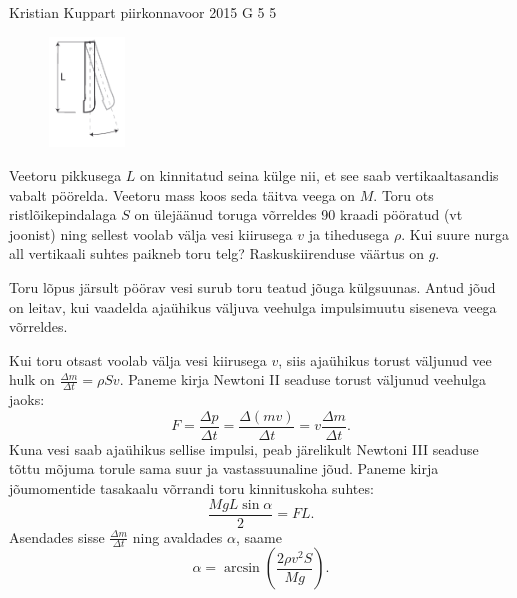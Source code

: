 {Kristian Kuppart} %
{piirkonnavoor} %
{2015} %
{G 5} %
{5} %
{
\ifStatement
\begin{figure}
 \vspace{-30pt}
 \begin{center}
 \includegraphics[width=0.18\textwidth]{2015-v2g-05-toru}
 \end{center}
\end{figure}
Veetoru pikkusega $L$ on kinnitatud seina külge nii, et see saab vertikaaltasandis vabalt pöörelda. Veetoru mass koos seda täitva veega on $M$. Toru ots ristlõikepindalaga $S$ on ülejäänud toruga võrreldes \num{90} kraadi pööratud (vt joonist) ning sellest voolab välja vesi kiirusega $v$ ja tihedusega $\rho$. Kui suure nurga all vertikaali suhtes paikneb toru telg? Raskuskiirenduse väärtus on $g$.
\pagebreak
\fi


\ifHint
Toru lõpus järsult pöörav vesi surub toru teatud jõuga külgsuunas. Antud jõud on leitav, kui vaadelda ajaühikus väljuva veehulga impulsimuutu siseneva veega võrreldes.
\fi


\ifSolution
Kui toru otsast voolab välja vesi kiirusega $v$, siis ajaühikus torust väljunud vee hulk on $\frac{\Delta m}{\Delta t}=\rho S v$. Paneme kirja Newtoni II seaduse torust väljunud veehulga jaoks: 
\[ F=\frac{\Delta p}{\Delta t}=\frac{\Delta(mv)}{\Delta t}=v \frac{\Delta m}{\Delta t}. \]
Kuna vesi saab ajaühikus sellise impulsi, peab järelikult Newtoni III seaduse tõttu mõjuma torule sama suur ja vastassuunaline jõud. Paneme kirja jõumomentide tasakaalu võrrandi toru kinnituskoha suhtes: 
\[ \frac{MgL\sin \alpha}{2}=FL. \]
Asendades sisse $\frac{\Delta m}{\Delta t}$ ning avaldades $\alpha$, saame
\[ \alpha=\arcsin \left(\frac{2\rho v^2 S}{Mg}\right). \]
\fi


}
